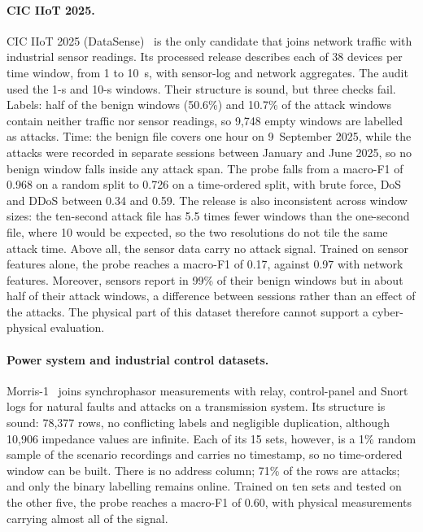 \paragraph{CIC IIoT 2025.}
CIC IIoT 2025 (DataSense)~\cite{firouzi2025datasense} is the only candidate that joins
network traffic with industrial sensor readings. Its processed release describes each of
38 devices per time window, from 1 to 10~s, with sensor-log and network aggregates. The
audit used the 1-s and 10-s windows. Their structure is sound, but three checks fail.
Labels: half of the benign windows (50.6\%) and 10.7\% of the attack windows contain
neither traffic nor sensor readings, so 9{,}748 empty windows are labelled as attacks.
Time: the benign file covers one hour on 9~September 2025, while the attacks were recorded
in separate sessions between January and June 2025, so no benign window falls inside any
attack span. The probe falls from a macro-F1 of 0.968 on a random split to 0.726 on a
time-ordered split, with brute force, DoS and DDoS between 0.34 and 0.59. The release is
also inconsistent across window sizes: the ten-second attack file has 5.5 times fewer
windows than the one-second file, where 10 would be expected, so the two resolutions do
not tile the same attack time. Above all, the sensor data carry no attack signal. Trained
on sensor features alone, the probe reaches a macro-F1 of 0.17, against 0.97 with network
features. Moreover, sensors report in 99\% of their benign windows but in about half of
their attack windows, a difference between sessions rather than an effect of the attacks.
The physical part of this dataset therefore cannot support a cyber-physical evaluation.

\paragraph{Power system and industrial control datasets.}
Morris-1~\cite{pan2015hybrid} joins synchrophasor measurements with relay, control-panel
and Snort logs for natural faults and attacks on a transmission system. Its structure is
sound: 78{,}377 rows, no conflicting labels and negligible duplication, although 10{,}906
impedance values are infinite. Each of its 15 sets, however, is a 1\% random sample of the
scenario recordings and carries no timestamp, so no time-ordered window can be built.
There is no address column; 71\% of the rows are attacks; and only the binary labelling
remains online. Trained on ten sets and tested on the other five, the probe reaches a
macro-F1 of 0.60, with physical measurements carrying almost all of the signal.

